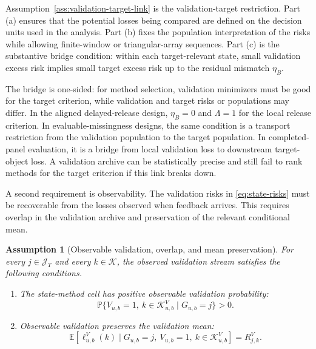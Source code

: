 \documentclass[a4paper, 12pt]{article}
\theoremstyle{plain}
\newtheorem{assumption}{Assumption}
\theoremstyle{remark}
\newcommand{\E}{\mathbb{E}}
\newcommand{\Prb}{\mathbb{P}}
\newcommand{\Kcal}{\mathcal{K}}
\newcommand{\1}{\mathbf{1}}
\begin{document}
Assumption~\ref{ass:validation-target-link} is the validation-target restriction. Part (a) ensures that the potential losses being compared are defined on the decision units used in the analysis. Part (b) fixes the population interpretation of the risks while allowing finite-window or triangular-array sequences. Part (c) is the substantive bridge condition: within each target-relevant state, small validation excess risk implies small target excess risk up to the residual mismatch \(\eta_B\).

The bridge is one-sided: for method selection, validation minimizers must be good for the target criterion, while validation and target risks or populations may differ. In the aligned delayed-release design, \(\eta_B=0\) and \(\Lambda=1\) for the local release criterion. In evaluable-missingness designs, the same condition is a transport restriction from the validation population to the target population. In completed-panel evaluation, it is a bridge from local validation loss to downstream target-object loss. A validation archive can be statistically precise and still fail to rank methods for the target criterion if this link breaks down.

A second requirement is observability. The validation risks in \eqref{eq:state-risks} must be recoverable from the losses observed when feedback arrives. This requires overlap in the validation archive and preservation of the relevant conditional mean.

\begin{assumption}[Observable validation, overlap, and mean preservation]
\label{ass:observable-validation}
For every \(j\in\mathcal J_T\) and every \(k\in\Kcal\), the observed validation stream satisfies the following conditions.
\begin{enumerate}[label=(\alph*), leftmargin=*]
    \item The state-method cell has positive observable validation probability:
    \begin{equation*}
        \Prb\{V_{u,b}=1,\ k\in\Kcal^V_{u,b}\mid G_{u,b}=j\}>0 .
    \end{equation*}
    \item Observable validation preserves the validation mean:
    \begin{equation*}
        \E\!\left[\ell^V_{u,b}(k)\mid G_{u,b}=j,\ V_{u,b}=1,\ k\in\Kcal^V_{u,b}\right]
        =R^V_{j,k} .
    \end{equation*}
\end{enumerate}
\end{assumption}
\end{document}
